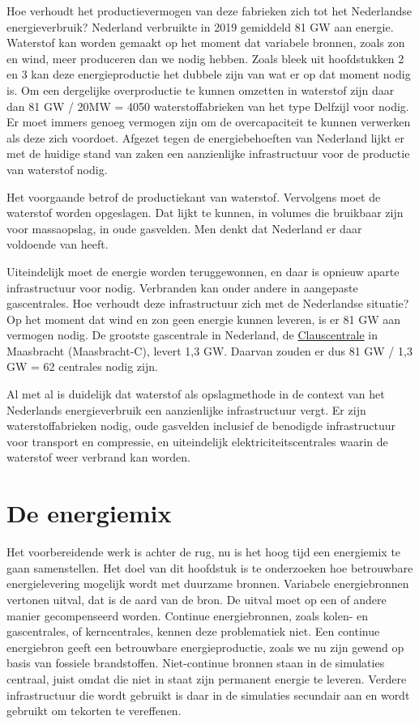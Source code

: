 \documentclass[
  11pt,
  a4paper,
]{book}
\begin{document}
Hoe verhoudt het productievermogen van deze fabrieken zich tot het Nederlandse energieverbruik? Nederland verbruikte in 2019 gemiddeld 81 GW aan energie. Waterstof kan worden gemaakt op het moment dat variabele bronnen, zoals zon en wind, meer produceren dan we nodig hebben. Zoals bleek uit hoofdstukken 2 en 3 kan deze energieproductie het dubbele zijn van wat er op dat moment nodig is. Om een dergelijke overproductie te kunnen omzetten in waterstof zijn daar dan 81 GW / 20MW = 4050 waterstoffabrieken van het type Delfzijl voor nodig. Er moet immers genoeg vermogen zijn om de overcapaciteit te kunnen verwerken als deze zich voordoet. Afgezet tegen de energiebehoeften van Nederland lijkt er met de huidige stand van zaken een aanzienlijke infrastructuur voor de productie van waterstof nodig.

Het voorgaande betrof de productiekant van waterstof. Vervolgens moet de waterstof worden opgeslagen. Dat lijkt te kunnen, in volumes die bruikbaar zijn voor massaopslag, in oude gasvelden. Men denkt dat Nederland er daar voldoende van heeft.

Uiteindelijk moet de energie worden teruggewonnen, en daar is opnieuw aparte infrastructuur voor nodig. Verbranden kan onder andere in aangepaste gascentrales. Hoe verhoudt deze infrastructuur zich met de Nederlandse situatie? Op het moment dat wind en zon geen energie kunnen leveren, is er 81 GW aan vermogen nodig. De grootste gascentrale in Nederland, de \href{https://nl.wikipedia.org/wiki/Lijst_van_elektriciteitscentrales_in_Nederland}{Clauscentrale} in Maasbracht (Maasbracht-C), levert 1,3 GW. Daarvan zouden er dus 81 GW / 1,3 GW = 62 centrales nodig zijn.

Al met al is duidelijk dat waterstof als opslagmethode in de context van het Nederlands energieverbruik een aanzienlijke infrastructuur vergt. Er zijn waterstoffabrieken nodig, oude gasvelden inclusief de benodigde infrastructuur voor transport en compressie, en uiteindelijk elektriciteitscentrales waarin de waterstof weer verbrand kan worden.

\hypertarget{de-energiemix}{%
\chapter{De energiemix}\label{de-energiemix}}

Het voorbereidende werk is achter de rug, nu is het hoog tijd een energiemix te gaan samenstellen. Het doel van dit hoofdstuk is te onderzoeken hoe betrouwbare energielevering mogelijk wordt met duurzame bronnen. Variabele energiebronnen vertonen uitval, dat is de aard van de bron. De uitval moet op een of andere manier gecompenseerd worden. Continue energiebronnen, zoals kolen- en gascentrales, of kerncentrales, kennen deze problematiek niet. Een continue energiebron geeft een betrouwbare energieproductie, zoals we nu zijn gewend op basis van fossiele brandstoffen. Niet-continue bronnen staan in de simulaties centraal, juist omdat die niet in staat zijn permanent energie te leveren. Verdere infrastructuur die wordt gebruikt is daar in de simulaties secundair aan en wordt gebruikt om tekorten te vereffenen.
\end{document}
